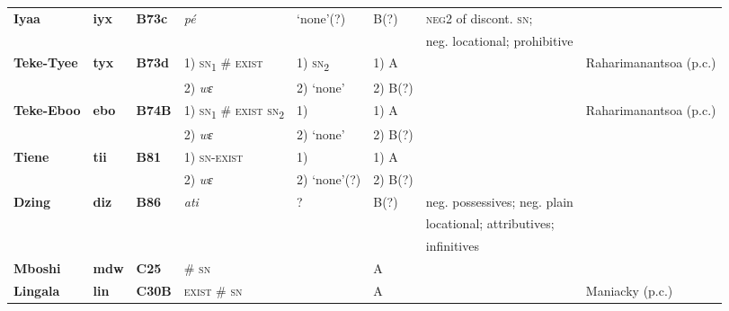 \documentclass[output=paper]{langscibook}
\begin{document}
\begin{sidewaystable}[p]%
\begin{scriptsize}
\begin{tabularx}{\textwidth}{llllllll}
\lsptoprule
\textbf{Iyaa} 	&\textbf{iyx} 	&\textbf{B73c} 	&\textit{p\'e}		&`none'(?) 								&B(?) 	&\textsc{neg}2 of discont. \textsc{sn};						&\citet{Mouandza2001}\\
				&				&				&				&										&		&neg. locational; prohibitive						&\\\midrule
\textbf{Teke-Tyee}&\textbf{tyx}	&\textbf{B73d}	&1) \textsc{sn}\textsubscript{1} \# \textsc{exist}%
																&1) \textendash \textsc{sn}\textsubscript{2}%
																										&1) A{}	&												&Raharimanantsoa (p.c.)\\
				&				&				&2) \textit{wɛ}	&2) `none'								&2) B(?)	&												&\\\midrule
\textbf{Teke-Eboo}&\textbf{ebo} 	&\textbf{B74B}	&1) \textsc{sn}\textsubscript{1} \# \textsc{exist} \textsc{sn}\textsubscript{2}%
																&1) \textendash							&1) A{}	&												&Raharimanantsoa (p.c.)\\
				&				&				&2) \textit{wɛ}	&2) `none'								&2) B(?)	&												&\\\midrule
\textbf{Tiene} 	&\textbf{tii} 		&\textbf{B81} 	&1) \textsc{sn-exist}&1) \textendash						&1) A{}	&												&\citet{Ellington1977}\\
				&				&				&2) \textit{wɛ} 	&2) `none'(?)							&2) B(?)\\\midrule
\textbf{Dzing} 	&\textbf{diz} 	&\textbf{B86} 	&\textit{ati} 		&? 										& B(?) 	& neg. possessives; neg. plain						&\citet{Mertens1938}\\
				&				&				&				&										&		&locational; attributives;\\
				&				&				&				&										&		&infinitives\\\midrule
\textbf{Mboshi} 	&\textbf{mdw} 	&\textbf{C25} 	&\# \textsc{sn}	& 										&A 		&  												&\citet{Amboulou1998}\\\midrule
\textbf{Lingala} 	&\textbf{lin}		&\textbf{C30B} 	&\textsc{exist} \# \textsc{sn}&\textendash					&A{}	&												&Maniacky (p.c.)\\\midrule

\end{tabularx}
\end{scriptsize}
\end{sidewaystable}
\end{document}
